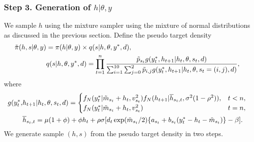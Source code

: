 \subsubsection*{Step 3. Generation of $h|\theta,y$}
We sample $h$ using the mixture sampler using the mixture of normal distributions as discussed in the previous section. Define the pseudo target density
\begin{align*}
    \Tilde{\pi}(h,s|\theta,y) &= \pi(h|\theta,y) \times q(s|h,\theta, y^*, d), \\
    &q(s|h,\theta, y^*, d) = \prod_{t=1}^n \frac{\Tilde{p}_{s_t} g(y_t^*, h_{t+1}| h_t, \theta, s_t, d)}{\sum_{i=1}^{10}\sum_{j=0}^2 \Tilde{p}_{i,j} g(y_t^*, h_{t+1}| h_t, \theta, s_t=(i,j), d)}, 
\end{align*}
where
\begin{align*}
    g(y_t^*, &h_{t+1}| h_t, \theta, s_t, d) = 
    \begin{cases}
        f_N(y_t^*|\Tilde{m}_{s_t} + h_t, v_{s_t}^2) f_N(h_{t+1}|\overline{h}_{s_t, t}, \sigma^2(1-\rho^2)), & t < n, \\
        f_N(y_t^*|\Tilde{m}_{s_t} + h_t, v_{s_t}^2) & t = n, 
    \end{cases} \\
    &\overline{h}_{s_t, t} = \mu(1+\phi) + \phi h_t +  \rho \sigma[d_t \exp(\Tilde{m}_{s_t}/2) \{ a_{s_t} + b_{s_t} (y_t^* - h_t - \Tilde{m}_{s_t})\} - \beta].
\end{align*}
We generate sample $(h, s)$ from the pseudo target density in two steps. 
